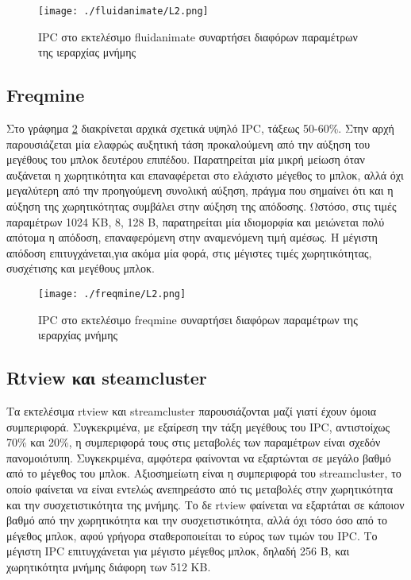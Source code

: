 \documentclass{article}
\newcommand{\eng}[1]{\foreignlanguage{english}{#1}}
\begin{document}
\begin{figure}[h]
    \centering
    \texttt{[image: ./fluidanimate/L2.png]} 
    \caption{\eng{IPC} στο εκτελέσιμο \eng{fluidanimate} συναρτήσει διαφόρων παραμέτρων της ιεραρχίας μνήμης}
    \label{fig:exp2-fluidanimate}
\end{figure}
\FloatBarrier

\clearpage
\subsection{\eng{Freqmine}}

Στο γράφημα \ref{fig:exp2-freqmine} διακρίνεται αρχικά σχετικά υψηλό \eng{IPC}, τάξεως 50-60\%. Στην αρχή παρουσιάζεται μία ελαφρώς αυξητική τάση προκαλούμενη από την αύξηση του μεγέθους του μπλοκ δευτέρου επιπέδου. Παρατηρείται μία μικρή μείωση όταν αυξάνεται η χωρητικότητα και επαναφέρεται στο ελάχιστο μέγεθος το μπλοκ, αλλά όχι μεγαλύτερη από την προηγούμενη συνολική αύξηση, πράγμα που σημαίνει ότι και η αύξηση της χωρητικότητας συμβάλει στην αύξηση της απόδοσης. Ωστόσο, στις τιμές παραμέτρων 1024 ΚΒ, 8, 128 Β, παρατηρείται μία ιδιομορφία και μειώνεται πολύ απότομα η απόδοση, επαναφερόμενη στην αναμενόμενη τιμή αμέσως. Η μέγιστη απόδοση επιτυγχάνεται,για ακόμα μία φορά, στις μέγιστες τιμές χωρητικότητας, συσχέτισης και μεγέθους μπλοκ.

\begin{figure}[h]
    \centering
    \texttt{[image: ./freqmine/L2.png]} 
    \caption{\eng{IPC} στο εκτελέσιμο \eng{freqmine} συναρτήσει διαφόρων παραμέτρων της ιεραρχίας μνήμης}
    \label{fig:exp2-freqmine}
\end{figure}
\FloatBarrier

\clearpage
\subsection{\eng{Rtview} και \eng{steamcluster}}

Τα εκτελέσιμα \eng{rtview} και \eng{streamcluster} παρουσιάζονται μαζί γιατί έχουν όμοια συμπεριφορά. Συγκεκριμένα, με εξαίρεση την τάξη μεγέθους του \eng{IPC}, αντιστοίχως 70\% και 20\%, η συμπεριφορά τους στις μεταβολές των παραμέτρων είναι σχεδόν πανομοιότυπη. Συγκεκριμένα, αμφότερα φαίνονται να εξαρτώνται σε μεγάλο βαθμό από το μέγεθος του μπλοκ. Αξιοσημείωτη είναι η συμπεριφορά του \eng{streamcluster}, το οποίο φαίνεται να είναι εντελώς ανεπηρεάστο από τις μεταβολές στην χωρητικότητα και την συσχετιστικότητα της μνήμης. Το δε \eng{rtview} φαίνεται να εξαρτάται σε κάποιον βαθμό από την χωρητικότητα και την συσχετιστικότητα, αλλά όχι τόσο όσο από το μέγεθος μπλοκ, αφού γρήγορα σταθεροποιείται το εύρος των τιμών του \eng{IPC}. Το μέγιστη \eng{IPC} επιτυγχάνεται για μέγιστο μέγεθος μπλοκ, δηλαδή 256 Β, και χωρητικότητα μνήμης διάφορη των 512 ΚΒ.
\end{document}
